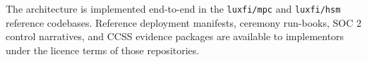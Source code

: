 The architecture is implemented end-to-end in the
\texttt{luxfi/mpc} and \texttt{luxfi/hsm} reference codebases.
Reference deployment manifests, ceremony run-books, SOC 2 control
narratives, and CCSS evidence packages are available to
implementors under the licence terms of those repositories.

